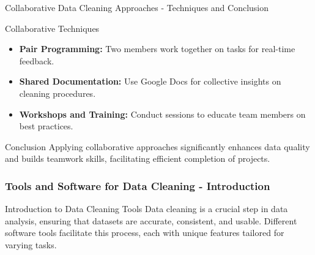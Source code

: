 \documentclass[aspectratio=169]{beamer}
\begin{document}
\begin{frame}[fragile]{Collaborative Data Cleaning Approaches - Techniques and Conclusion}
  \begin{block}{Collaborative Techniques}
    \begin{itemize}
      \item \textbf{Pair Programming:} Two members work together on tasks for real-time feedback.
      \item \textbf{Shared Documentation:} Use Google Docs for collective insights on cleaning procedures.
      \item \textbf{Workshops and Training:} Conduct sessions to educate team members on best practices.
    \end{itemize}
  \end{block}
  
  \begin{block}{Conclusion}
    Applying collaborative approaches significantly enhances data quality and builds teamwork skills, facilitating efficient completion of projects.
  \end{block}
\end{frame}

\begin{frame}[fragile]
    \frametitle{Tools and Software for Data Cleaning - Introduction}
    \begin{block}{Introduction to Data Cleaning Tools}
        Data cleaning is a crucial step in data analysis, ensuring that datasets are accurate, consistent, and usable. Different software tools facilitate this process, each with unique features tailored for varying tasks.
    \end{block}
\end{frame}
\end{document}

